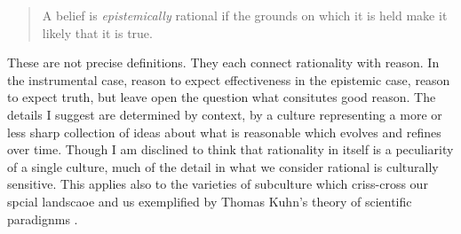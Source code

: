 \begin{quote}
A belief is \emph{epistemically} rational if the grounds on which it is held make it likely that it is true. 
\end{quote}

These are not precise definitions.
They each connect rationality with reason.
In the instrumental case, reason to expect effectiveness in the epistemic case, reason to expect truth, but leave open the question what consitutes good reason.
The details I suggest are determined by context, by a culture representing a more or less sharp collection of ideas about what is reasonable which evolves and refines over time.
Though I am disclined to think that rationality in itself is a peculiarity of a single culture,  much of the detail in what we consider rational is culturally sensitive.
This applies also to the varieties of subculture which criss-cross our spcial landscaoe and us exemplified by Thomas Kuhn's theory of scientific paradignms \cite{kuhn2012structure}.
